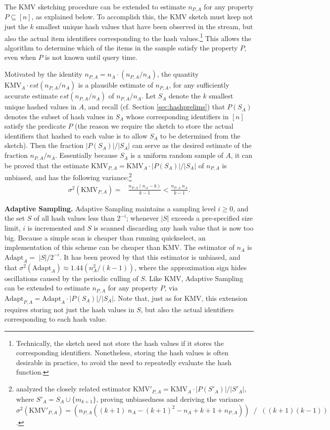 \documentclass{article}
\newcommand{\romKMV}{\mathrm{KMV}}
\newcommand{\romAdapt}{\mathrm{Adapt}}
\begin{document}
The KMV sketching procedure can be extended to estimate $n_{P, A}$ for any property $P \subseteq [n]$, as explained below.
To accomplish this, the KMV sketch must keep not just the $k$ smallest unique hash values that have been observed in the stream, but also 
the actual item identifiers corresponding to the hash values.\footnote{Technically, the sketch need not store the hash values if it stores the corresponding identifiers. 
Nonetheless, storing the hash values is often desirable in practice, to avoid the need to repeatedly evaluate the hash function.}
This allows the algorithm to determine which of the items in the sample
satisfy the property $P$, even when $P$ is not known until query time.

Motivated by the identity $n_{P, A} = n_A \cdot (n_{P, A} / n_A)$, the quantity $\romKMV_A \cdot est(n_{P, A}/n_A)$ is a plausible
estimate of $n_{P, A}$, for any sufficiently accurate estimate $est(n_{P, A}/n_A)$  of $n_{P, A}/n_A$.
Let $S_A$ denote the $k$ smallest unique hashed values in $A$, and recall (cf. Section \ref{sec:hashprelims}) that $P(S_A)$ denotes
the subset of hash values in $S_A$ whose corresponding identifiers in $[n]$ satisfy the predicate $P$ (the reason we require
the sketch to store the actual identifiers that hashed to each value is to allow $S_A$ to be determined from the sketch). 
Then the fraction $|P(S_A)| / |S_A|$ can serve as the desired estimate of the fraction $n_{P, A}/n_A$. 
Essentially because $S_A$ is a uniform random sample of $A$, it can be proved
that the estimate $\romKMV_{P, A} = \romKMV_A \cdot |P(S_A)| / |S_A|$ of $n_{P, A}$ 
is unbiased, and has the following variance:\footnote{\cite{beyer2009distinct} analyzed the closely related estimator
$\romKMV'_{P, A} = \romKMV_A \cdot |P(S'_A)| / |S'_A|$, where $S'_A = S_A \cup \{m_{k+1}\}$,
proving unbiasedness and 
deriving the variance $\sigma^2(\romKMV'_{P, A}) = 
(n_{P, A}((k+1) \; n_A - (k+1)^2 - n_A + k+1 + n_{P, A}))\;\;/\;\;((k+1)(k-1))
$.}
\begin{align}
\sigma^2(\romKMV_{P, A}) = & \frac{n_{P, A} (n_A - k)}{k-1} <
\frac{n_{P, A} \; n_A}{k-1}. \end{align}





\medskip \noindent \textbf{Adaptive Sampling.}\label{subsubAdapt}
Adaptive Sampling maintains a sampling level $i \ge 0$, and the set $S$
of all hash values less than $2^{-i}$; whenever $|S|$ exceeds a pre-specified
size limit, $i$ is incremented and $S$ is scanned discarding any hash value
that is now too big. Because a simple scan is cheaper than running
quickselect, an implementation of this scheme can be cheaper than
KMV. The estimator of $n_A$ is $\romAdapt_A = \; |S| /
2^{-i}$. It has been proved by \cite{flajolet1990adaptive} that this
estimator is unbiased, and that $\sigma^2(\romAdapt_A) \approx 1.44
(n_A^2/(k-1))$, where the approximation sign hides oscillations caused
by the periodic culling of $S$.  
Like KMV, Adaptive Sampling can be extended to estimate $n_{P, A}$ for any property $P$, via 
$\romAdapt_{P, A} = \romAdapt_A \cdot |P(S_A)| / |S_A|$. Note that, just as for KMV, this extension requires storing not just the hash values in $S$,
but also the actual identifiers corresponding to each hash value.
\end{document}
